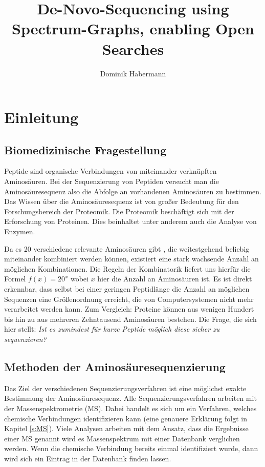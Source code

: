 \documentclass[a4paper, 12pt]{article}
\title{De-Novo-Sequencing using Spectrum-Graphs, enabling Open Searches}
\author{Dominik Habermann}
\newcommand{\dashAndSpace}{\textendash \space}
\newcommand{\dashAndSpaceSeq}[1]{\dashAndSpace#1 \dashAndSpace}
\begin{document}
\maketitle

\section{Einleitung}\label{s:Einleitung}
\subsection{Biomedizinische Fragestellung}
Peptide sind organische Verbindungen von miteinander verknüpften Aminosäuren. Bei der Sequenzierung von Peptiden versucht man die Aminosäuresequenz \dashAndSpaceSeq{also die Abfolge an vorhandenen Aminosäuren} zu bestimmen. Das Wissen über die Aminosäuresequenz ist von großer Bedeutung für den Forschungsbereich der Proteomik. Die Proteomik beschäftigt sich mit der Erforschung von Proteinen. Dies beinhaltet unter anderem auch die Analyse von Enzymen.

Da es 20 verschiedene relevante Aminosäuren gibt \cite[377]{rudat2021alanins}, die weitestgehend beliebig miteinander kombiniert werden können, existiert eine stark wachsende Anzahl an möglichen Kombinationen. Die Regeln der Kombinatorik liefert uns hierfür die Formel $ f(x)=20^x $ wobei $ x $ hier die Anzahl an Aminosäuren ist. Es ist direkt erkennbar, dass selbst bei einer geringen Peptidlänge die Anzahl an möglichen Sequenzen eine Größenordnung erreicht, die von Computersystemen nicht mehr verarbeitet werden kann. Zum Vergleich: Proteine können aus wenigen Hundert bis hin zu aus mehreren Zehntausend Aminosäuren bestehen. Die Frage, die sich hier stellt: \emph{Ist es zumindest für kurze Peptide möglich diese sicher zu sequenzieren?}

\subsection{Methoden der Aminosäuresequenzierung}
Das Ziel der verschiedenen Sequenzierungsverfahren ist eine möglichst exakte Bestimmung der Aminosäuresequenz. Alle Sequenzierungsverfahren arbeiten mit der Massenspektrometrie (MS). Dabei handelt es sich um ein Verfahren, welches chemische Verbindungen identifizieren kann (eine genauere Erklärung folgt in Kapitel \ref{s:MS}). Viele Analysen arbeiten mit dem Ansatz, dass die Ergebnisse einer MS \dashAndSpaceSeq{genannt wird es Massenspektrum}mit einer Datenbank verglichen werden. Wenn die chemische Verbindung bereits einmal identifiziert wurde, dann wird sich ein Eintrag in der Datenbank finden lassen.
\end{document}
